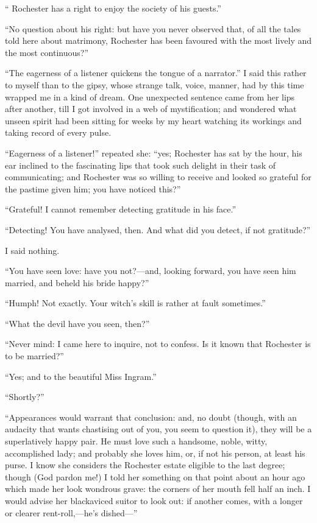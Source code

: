 \enquote{\Mr{} Rochester has a right to enjoy the society of his guests.}

\enquote{No question about his right: but have you never observed that,
	of all the tales told here about matrimony, \Mr{} Rochester has been
	favoured with the most lively and the most continuous?}

\enquote{The eagerness of a listener quickens the tongue of a
	narrator.} I said this rather to myself than to the gipsy, whose
strange talk, voice, manner, had by this time wrapped me in a kind of
dream. One unexpected sentence came from her lips after another, till I
got involved in a web of mystification; and wondered what unseen spirit
had been sitting for weeks by my heart watching its workings and taking
record of every pulse.

\enquote{Eagerness of a listener!} repeated she: \enquote{yes; \Mr{}
	Rochester has sat by the hour, his ear inclined to the fascinating lips
	that took such delight in their task of communicating; and \Mr{} Rochester
	was so willing to receive and looked so grateful for the pastime given
	him; you have noticed this?}

\enquote{Grateful! I cannot remember detecting gratitude in his face.}

\enquote{Detecting! You have analysed, then. And what did you detect,
	if not gratitude?}

I said nothing.

\enquote{You have seen love: have you not?---and, looking forward, you
	have seen him married, and beheld his bride happy?}

\enquote{Humph! Not exactly. Your witch's skill is rather at fault
	sometimes.}

\enquote{What the devil have you seen, then?}

\enquote{Never mind: I came here to inquire, not to confess. Is it
	known that \Mr{} Rochester is to be married?}

\enquote{Yes; and to the beautiful Miss Ingram.}

\enquote{Shortly?}

\enquote{Appearances would warrant that conclusion: and, no doubt
	(though, with an audacity that wants chastising out of you, you seem to
	question it), they will be a superlatively happy pair. He must love
	such a handsome, noble, witty, accomplished lady; and probably she loves
	him, or, if not his person, at least his purse. I know she considers
	the Rochester estate eligible to the last degree; though (God pardon
	me!) I told her something on that point about an hour ago which made her
	look wondrous grave: the corners of her mouth fell half an inch. I
	would advise her blackaviced suitor to look out: if another comes, with
	a longer or clearer rent-roll,---he's dished---}

